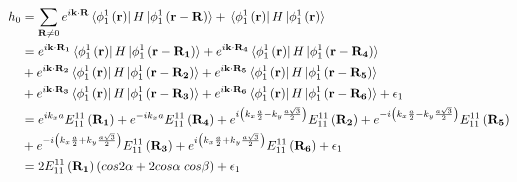 \documentclass{article}
\begin{document}
\begin{align}
    h_0 & = \sum_{\mathbf{R} \neq 0} e^{i\mathbf{k\cdot R}} \bra*{\phi_1^1 \left(\mathbf{r}\right)} H \ket*{\phi_1^1\left(\mathbf{r}-\mathbf{R}\right)}
    + \bra*{\phi_1^1 \left(\mathbf{r}\right)} H \ket*{\phi_1^1\left(\mathbf{r}\right)}  \nonumber                                                                                                                                                                                                                                         \\
        & = e^{i\mathbf{k\cdot R_1}} \bra*{\phi_1^1 \left(\mathbf{r}\right)} H \ket*{\phi_1^1\left(\mathbf{r}-\mathbf{R_1}\right)} + e^{i\mathbf{k\cdot R_4}} \bra*{\phi_1^1 \left(\mathbf{r}\right)} H \ket*{\phi_1^1\left(\mathbf{r}-\mathbf{R_4}\right)} \nonumber                                                                     \\
        & + e^{i\mathbf{k\cdot R_2}} \bra*{\phi_1^1 \left(\mathbf{r}\right)} H \ket*{\phi_1^1\left(\mathbf{r}-\mathbf{R_2}\right)} + e^{i\mathbf{k\cdot R_5}} \bra*{\phi_1^1 \left(\mathbf{r}\right)} H \ket*{\phi_1^1\left(\mathbf{r}-\mathbf{R_5}\right)} \nonumber                                                                     \\
        & + e^{i\mathbf{k\cdot R_3}} \bra*{\phi_1^1 \left(\mathbf{r}\right)} H \ket*{\phi_1^1\left(\mathbf{r}-\mathbf{R_3}\right)} + e^{i\mathbf{k\cdot R_6}} \bra*{\phi_1^1 \left(\mathbf{r}\right)} H \ket*{\phi_1^1\left(\mathbf{r}-\mathbf{R_6}\right)} + \epsilon_1 \nonumber                                                        \\
        & = e^{i k_x a} E_{11}^{11}\left(\mathbf{R_1}\right) + e^{-i k_x a} E_{11}^{11}\left(\mathbf{R_4}\right) +  e^{i \left( k_x \frac{a}{2} - k_y \frac{a\sqrt{3}}{2} \right)} E_{11}^{11}\left(\mathbf{R_2}\right) +  e^{-i \left( k_x \frac{a}{2} - k_y \frac{a\sqrt{3}}{2} \right)} E_{11}^{11}\left(\mathbf{R_5}\right) \nonumber \\
        & + e^{-i \left( k_x \frac{a}{2} + k_y \frac{a\sqrt{3}}{2} \right)} E_{11}^{11}\left(\mathbf{R_3}\right) + e^{i \left( k_x \frac{a}{2} + k_y \frac{a\sqrt{3}}{2} \right)} E_{11}^{11}\left(\mathbf{R_6}\right) + \epsilon_1 \nonumber                                                                                             \\
        & = 2 E_{11}^{11}\left(\mathbf{R_1}\right) \left(cos2\alpha + 2cos\alpha\; cos\beta\right) + \epsilon_1  \nonumber
\end{align}
\clearpage
\end{document}
